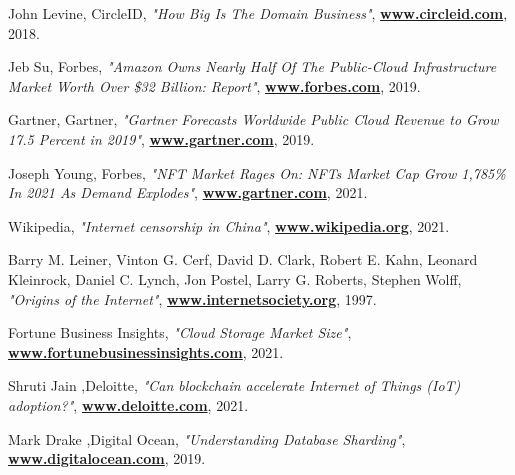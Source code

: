 \documentclass{article}
\let\oldhref\href
\renewcommand{\href}[2]{\oldhref{#1}{\bfseries#2}}
\begin{document}
\newpage
\begin{thebibliography}{999}
    John Levine, CircleID,
    \emph{"How Big Is The Domain Business"},
    \href{https://www.circleid.com/posts/20180813_how_big_is_the_domain_business/}{www.circleid.com},
    2018.

    Jeb Su, Forbes,
    \emph{"Amazon Owns Nearly Half Of The Public-Cloud Infrastructure Market Worth Over \$32 Billion: Report"},
    \href{https://www.forbes.com/sites/jeanbaptiste/2019/08/02/amazon-owns-nearly-half-of-the-public-cloud-infrastructure-market-worth-over-32-billion-report/ }{www.forbes.com},
    2019.
 
    Gartner, Gartner,
    \emph{"Gartner Forecasts Worldwide Public Cloud Revenue to Grow 17.5 Percent in 2019"},
    \href{https://www.gartner.com/en/newsroom/press-releases/2019-04-02-gartner-forecasts-worldwide-public-cloud-revenue-to-g}{www.gartner.com},
    2019.

    Joseph Young, Forbes,
    \emph{"NFT Market Rages On: NFTs Market Cap Grow 1,785\% In 2021 As Demand Explodes"},
    \href{https://www.forbes.com/sites/youngjoseph/2021/03/29/nft-market-rages-on-nfts-market-cap-grow-1785-in-2021-as-demand-explodes/
}{www.gartner.com},
    2021.
  
    Wikipedia,
    \emph{"Internet censorship in China"},
    \href{https://www.wikipedia.org/wiki/Internet_censorship_in_China}{www.wikipedia.org},
    2021.
    
    Barry M. Leiner, Vinton G. Cerf, David D. Clark, Robert E. Kahn, Leonard Kleinrock, Daniel C. Lynch, Jon Postel, Larry G. Roberts, Stephen Wolff,
    \emph{"Origins of the Internet"},
    \href{https://www.internetsociety.org/internet/history-internet/brief-history-internet}{www.internetsociety.org},
    1997.

    Fortune Business Insights,
    \emph{"Cloud Storage Market Size"},
    \href{https://www.fortunebusinessinsights.com/cloud-storage-market-102773}{www.fortunebusinessinsights.com},
    2021.
    
    Shruti Jain ,Deloitte,
    \emph{"Can blockchain accelerate Internet of Things (IoT) adoption?"},
    \href{https://www2.deloitte.com/ch/en/pages/innovation/articles/blockchain-accelerate-iot-adoption.html}{www.deloitte.com},
    2021.

    Mark Drake ,Digital Ocean,
    \emph{"Understanding Database Sharding"},
    \href{https://www.digitalocean.com/community/tutorials/understanding-database-sharding}{www.digitalocean.com},
    2019.

\end{thebibliography}
\end{document}
